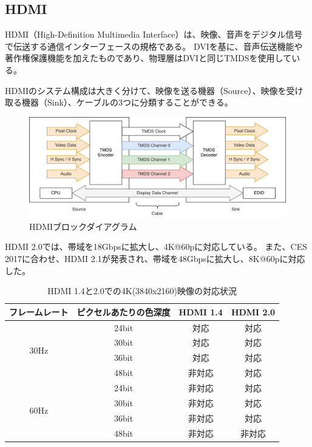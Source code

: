 \subsection{HDMI}
HDMI（High-Definition Multimedia Interface）は、映像、音声をデジタル信号で伝送する通信インターフェースの規格である。
DVIを基に、音声伝送機能や著作権保護機能を加えたものであり、物理層はDVIと同じTMDSを使用している。

HDMIのシステム構成は大きく分けて、映像を送る機器（Source）、映像を受け取る機器（Sink）、ケーブルの3つに分類することができる。

\begin{figure}[htbp]
  \begin{center}
    \includegraphics[bb=0 0 721 283,width=15cm]{img/hdmi-spec-structure.pdf}
  \end{center}
  \caption{HDMIブロックダイアグラム}
  \label{fig:hdmi-spec-structure}
\end{figure}

HDMI 2.0では、帯域を18Gbpsに拡大し、4K@60pに対応している。
また、CES 2017に合わせ、HDMI 2.1が発表され、帯域を48Gbpsに拡大し、8K@60pに対応した。

\begin{table}[htbp]
  \caption{HDMI 1.4と2.0での4K(3840x2160)映像の対応状況}
  \label{tb:video-bandwidth}
  \begin{center}
  \begin{tabular}{c|c|c|c}
    \hline
      フレームレート & ピクセルあたりの色深度 & HDMI 1.4 & HDMI 2.0\\\hline\hline
    \multirow{4}{*}{30Hz} &
        24bit & 対応   & 対応 \\\cline{2-4}
      & 30bit & 対応   & 対応 \\\cline{2-4}
      & 36bit & 対応   & 対応 \\\cline{2-4}
      & 48bit & 非対応 & 対応 \\\hline
    \multirow{4}{*}{60Hz} &
        24bit & 非対応 & 対応  \\\cline{2-4}
      & 30bit & 非対応 & 対応  \\\cline{2-4}
      & 36bit & 非対応 & 対応  \\\cline{2-4}
      & 48bit & 非対応 & 非対応 \\\hline
  \end{tabular}\end{center}
\end{table}

